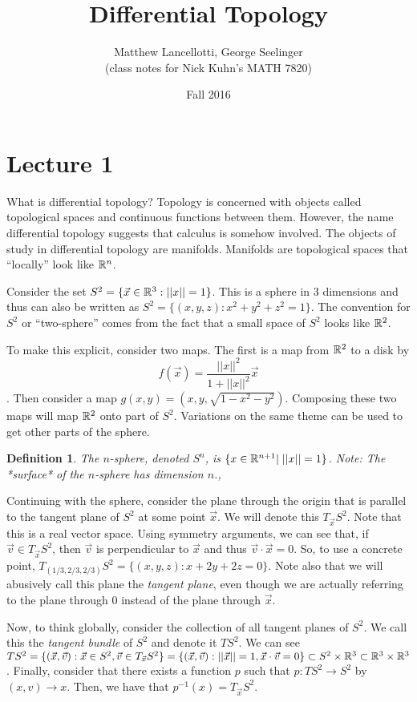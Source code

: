 \documentclass[11pt]{amsbook}
\title[Differential Topology]{Differential Topology}
\author{Matthew Lancellotti, George Seelinger\\ (class notes for Nick Kuhn's MATH 7820)}
\date{Fall 2016}
\theoremstyle{mystyle} \newtheorem{thrm}[thm]{Theorem}
\theoremstyle{mystyle} \newtheorem{defi}[thm]{Definition}
\theoremstyle{mystyle} \newtheorem{coro}[thm]{Corollary}
\theoremstyle{mystyle} \newtheorem{propo}[thm]{Proposition}
\theoremstyle{mystyle} \newtheorem{lemm}[thm]{Lemma}
\numberwithin{thm}{section}
\newcommand{\de}{\emph}
\begin{document}
\maketitle

\section{Lecture 1}

What is differential topology? Topology is concerned with objects called
topological spaces and continuous functions between them. However, the name
differential topology suggests that calculus is somehow involved. The objects of
study in differential topology are manifolds. Manifolds are topological spaces
that ``locally'' look like ${\mathbb R}^n$.
\begin{example}
	Consider the set $S^2 = \{ \vec{x} \in {\mathbb R}^3: ||x||=1\}$. This is a sphere in 3 dimensions and thus can also be written as $S^2 = \{(x,y,z) :
	x^2+y^2+z^2=1\}$. The convention for $S^2$ or ``two-sphere'' comes from the
	fact that a small space of $S^2$ looks like ${\mathbb R}^2$.

	To make this explicit, consider two maps. The first is a map from ${\mathbb R}^2$ to
	a disk by $$f(\vec{x}) = \frac{||x||^2}{1+||x||^2} \vec{x}$$. Then consider a
	map $g(x,y) = (x,y,\sqrt{1-x^2-y^2})$. Composing these two maps will map
	${\mathbb R}^2$ onto part of $S^2$. Variations on the same theme can be used to get
	other parts of the sphere.
\end{example}
\begin{defi}
	The \de{$n$-sphere}, denoted $S^n$, is $\{x \in {\mathbb R}^{n+1} |\; ||x||=1 \}$. Note: The *surface* of the $n$-sphere has dimension $n$.,
\end{defi}
\begin{example}
	Continuing with the sphere, consider the plane through the origin that is parallel to the tangent plane of $S^2$ at some
	point $\vec{x}$. We will denote this $T_{\vec{x}}S^2$. Note that this is a
	real vector space. Using symmetry arguments, we can see that, if $\vec{v}
	\in T_{\vec{x}}S^2$, then $\vec{v}$ is perpendicular to $\vec{x}$ and thus
	$\vec{v} \cdot \vec{x} = 0$. So, to use a concrete point,
	$T_{(1/3,2/3,2/3)} S^2 = \{(x,y,z) : x+2y+2z=0\}$.  Note also that we will abusively call this plane the \de{tangent plane}, even though we are actually referring to the plane through $0$ instead of the plane through $\vec{x}$.
\end{example}
\begin{example}
	Now, to think globally, consider the collection of all tangent planes of
	$S^2$. We call this the \de{tangent bundle} of $S^2$ and denote it
	$TS^2$. We can see $TS^2 = \{(\vec{x}, \vec{v}): \vec{x} \in S^2, \vec{v}
	\in T_{\vec{x}} S^2\} = \{(\vec{x},\vec{v}) : ||\vec{x}|| = 1, \vec{x}
	\cdot \vec{v} = 0\} \subset S^2 \times {\mathbb R}^3 \subset {\mathbb R}^3 \times {\mathbb R}^3$.
	Finally, consider that there exists a function $p$ such that $p: TS^2 \to
	S^2$ by $(x,v) \to x$. Then, we have that $p^{-1}(x) = T_{\vec{x}}S^2$.
\end{example}
\end{document}
